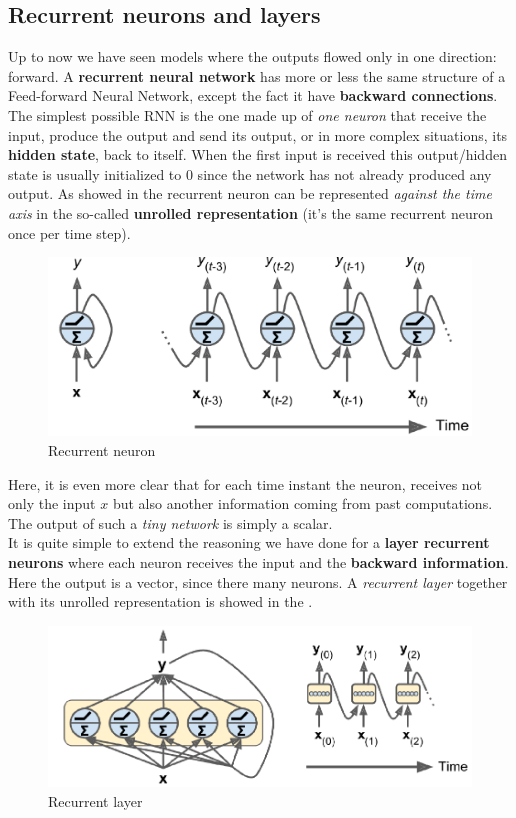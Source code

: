 \subsection{Recurrent neurons and layers}
Up to now we have seen models where the outputs flowed only in one direction: forward. A \textbf{recurrent neural network} has more or less the same structure of a Feed-forward Neural Network, except the fact it have \textbf{backward connections}. \\
The simplest possible RNN is the one made up of \textit{one neuron} that receive the input, produce the output and send its output, or in more complex situations, its \textbf{hidden state}, back to itself. When the first input is received this output/hidden state is usually initialized to 0 since the network has not already produced any output. As showed in  the recurrent neuron can be represented \textit{against the time axis} in the so-called \textbf{unrolled representation} (it's the same recurrent neuron once per time step).

\begin{figure}[h]
    \centering
    \includegraphics[scale=0.5]{img/rnn.png}
    \caption{Recurrent neuron}
    \label{fig:r_neuron}
\end{figure}
\noindent
Here, it is even more clear that for each time instant the neuron, receives not only the input $x$ but also another information coming from past computations. The output of such a \textit{tiny network} is simply a scalar.\\
It is quite simple to extend the reasoning we have done for a \textbf{layer recurrent neurons} where each neuron receives the input and the \textbf{backward information}. Here the output is a vector, since there many neurons. A \textit{recurrent layer} together with its unrolled representation is showed in the .

\begin{figure}
    \centering
    \includegraphics[scale=0.7]{img/rnn_layer.png}
    \caption{Recurrent layer}
    \label{fig:r_layer}
\end{figure}

